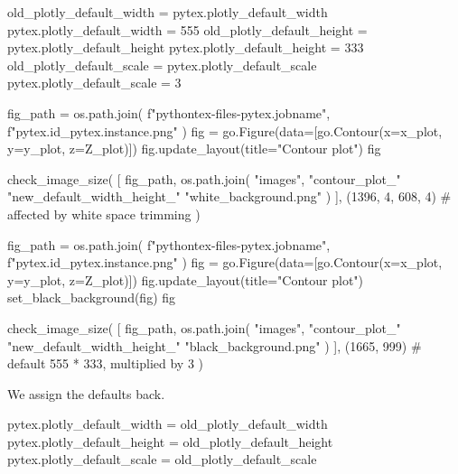 \documentclass[oneside]{book}
\begin{document}
\begin{pycell}
old_plotly_default_width = pytex.plotly_default_width
pytex.plotly_default_width = 555
old_plotly_default_height = pytex.plotly_default_height
pytex.plotly_default_height = 333
old_plotly_default_scale = pytex.plotly_default_scale
pytex.plotly_default_scale = 3
\end{pycell}

\begin{pycell}
fig_path = os.path.join(
    f"pythontex-files-{pytex.jobname}",
    f"{pytex.id}_{pytex.instance}.png"
)
fig = go.Figure(data=[go.Contour(x=x_plot, y=y_plot, z=Z_plot)])
fig.update_layout(title="Contour plot")
fig
\end{pycell}

\begin{pycell}
check_image_size(
    [
        fig_path,
        os.path.join(
            "images",
            "contour_plot_"
            "new_default_width_height_"
            "white_background.png"
        )
    ],
    (1396, 4, 608, 4)  # affected by white space trimming
)
\end{pycell}

\begin{pycell}
fig_path = os.path.join(
    f"pythontex-files-{pytex.jobname}",
    f"{pytex.id}_{pytex.instance}.png"
)
fig = go.Figure(data=[go.Contour(x=x_plot, y=y_plot, z=Z_plot)])
fig.update_layout(title="Contour plot")
set_black_background(fig)
fig
\end{pycell}

\begin{pycell}
check_image_size(
    [
        fig_path,
        os.path.join(
            "images",
            "contour_plot_"
            "new_default_width_height_"
            "black_background.png"
        )
    ],
    (1665, 999)  # default 555 * 333, multiplied by 3
)
\end{pycell}

\begin{mdcell}
We assign the defaults back.
\end{mdcell}

\begin{pycell}
pytex.plotly_default_width = old_plotly_default_width
pytex.plotly_default_height = old_plotly_default_height
pytex.plotly_default_scale = old_plotly_default_scale
\end{pycell}
\end{document}

